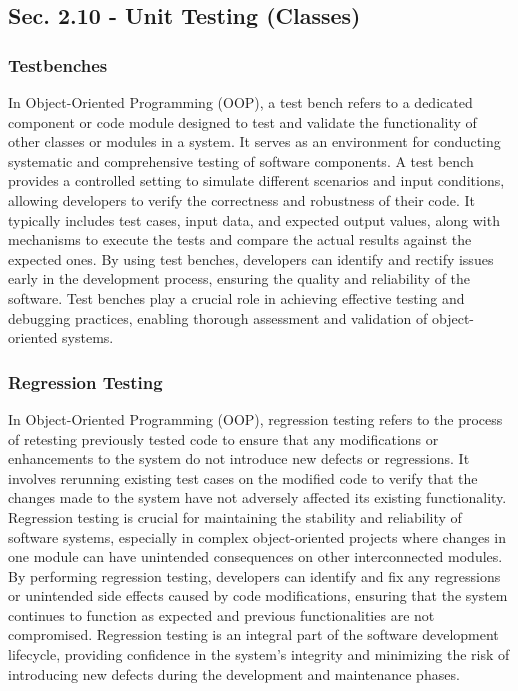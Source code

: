 \subsection*{Sec. 2.10 - Unit Testing (Classes)}
\subsubsection*{Testbenches}

In Object-Oriented Programming (OOP), a test bench refers to a dedicated component or code module designed to test and validate the functionality of other classes or modules in a system. It serves as an environment for conducting systematic and comprehensive 
testing of software components. A test bench provides a controlled setting to simulate different scenarios and input conditions, allowing developers to verify the correctness and robustness of their code. It typically includes test cases, input data, and expected 
output values, along with mechanisms to execute the tests and compare the actual results against the expected ones. By using test benches, developers can identify and rectify issues early in the development process, ensuring the quality and reliability of the 
software. Test benches play a crucial role in achieving effective testing and debugging practices, enabling thorough assessment and validation of object-oriented systems. \\

\subsubsection*{Regression Testing}

In Object-Oriented Programming (OOP), regression testing refers to the process of retesting previously tested code to ensure that any modifications or enhancements to the system do not introduce new defects or regressions. It involves rerunning existing test cases 
on the modified code to verify that the changes made to the system have not adversely affected its existing functionality. Regression testing is crucial for maintaining the stability and reliability of software systems, especially in complex object-oriented projects 
where changes in one module can have unintended consequences on other interconnected modules. By performing regression testing, developers can identify and fix any regressions or unintended side effects caused by code modifications, ensuring that the system continues 
to function as expected and previous functionalities are not compromised. Regression testing is an integral part of the software development lifecycle, providing confidence in the system's integrity and minimizing the risk of introducing new defects during the development 
and maintenance phases. \\

